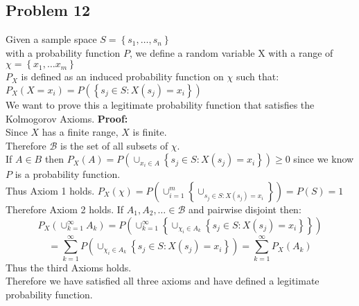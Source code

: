 \documentclass{article}
\begin{document}
\begin{flushleft}
\section*{Problem 12}
Given a sample space $S=\left\{s_1,\dots,s_n \right\}$\\
with a probability function $P$, we define a random variable X with a range of $\chi=\left\{x_1,\dots x_m \right\}$\\
$P_X$ is defined as an induced probability function on $\chi$ such that:\\
$P_X(X=x_i)=P(\left\{s_j\in S:X(s_j)=x_i \right\})$\\
We want to prove this a legitimate probability function that satisfies the Kolmogorov Axioms.\medbreak
\textbf{Proof:}\\
Since $X$ has a finite range, $X$ is finite.\\
Therefore $\mathcal{B}$ is the set of all subsets of $\chi$.\\
If $A \in B$ then $P_X(A)=P(\cup_{x_i\in A}\left\{s_j\in S:X(s_j)=x_i \right\})\geq 0$ since we know $P$ is a probability function.\\
Thus Axiom 1 holds.\medbreak
$P_X(\chi)=P(\cup_{i=1}^{m}\left\{\cup_{s_j \in S:X(s_j)=x_i} \right\})=P(S)=1$\\
Therefore Axiom 2 holds.\medbreak
If $A_1,A_2,\dots \in \mathcal{B}$ and pairwise disjoint then:\\
\[P_X(\cup_{k=1}^{\infty}A_k)=P(\cup_{k=1}^{\infty}\left\{\cup_{\chi_i \in A_k}\left\{s_j\in S:X(s_j)=x_i \right\} \right\})\]
\[=\sum_{k=1}^{\infty}P(\cup_{\chi_i \in A_k}\left\{s_j\in S:X(s_j)=x_i \right\})=\sum_{k=1}^{\infty}P_X(A_k)
\]
Thus the third Axioms holds.\\
Therefore we have satisfied all three axioms and have defined a legitimate probability function.


\end{flushleft}
\end{document}
